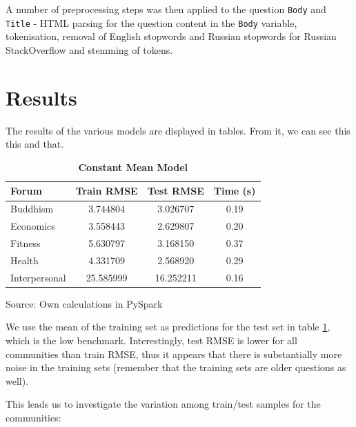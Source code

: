 \documentclass[11pt,preprint, authoryear]{article}
\numberwithin{equation}{section}
\begin{document}
A number of preprocessing steps was then applied to the question
\texttt{Body} and \texttt{Title} - HTML parsing for the question content
in the \texttt{Body} variable, tokenisation, removal of English
stopwords and Russian stopwords for Russian StackOverflow and stemming
of tokens.

\section{\texorpdfstring{Results
\label{Results}}{Results }}\label{results}

The results of the various models are displayed in tables. From it, we
can see this this and that.

\footnotesize

\begin{longtable}[htbp] {@{} lccc @{}} 
\caption{\textbf{Constant Mean Model}} 
\label{tab:mean_model} \\
\toprule
\textbf{Forum} &  \textbf{Train RMSE} &  \textbf{Test RMSE} &  \textbf{Time (s)} \\
\midrule
Buddhism      &              3.744804 &              3.026707 &                0.19 \\
Economics     &              3.558443 &              2.629807 &                0.20 \\
Fitness       &              5.630797 &              3.168150 &                0.37 \\
Health        &              4.331709 &              2.568920 &                0.29 \\
Interpersonal &             25.585999 &             16.252211 &                0.16 \\
\bottomrule
\end{longtable}\begin{center} Source: Own calculations in PySpark\end{center}

\normalsize

We use the mean of the training set as predictions for the test set in
table \ref{tab:mean_model}, which is the low benchmark. Interestingly,
test RMSE is lower for all communities than train RMSE, thus it appears
that there is substantially more noise in the training sets (remember
that the training sets are older questions as well).

This leads us to investigate the variation among train/test samples for
the communities:

\footnotesize
\end{document}
